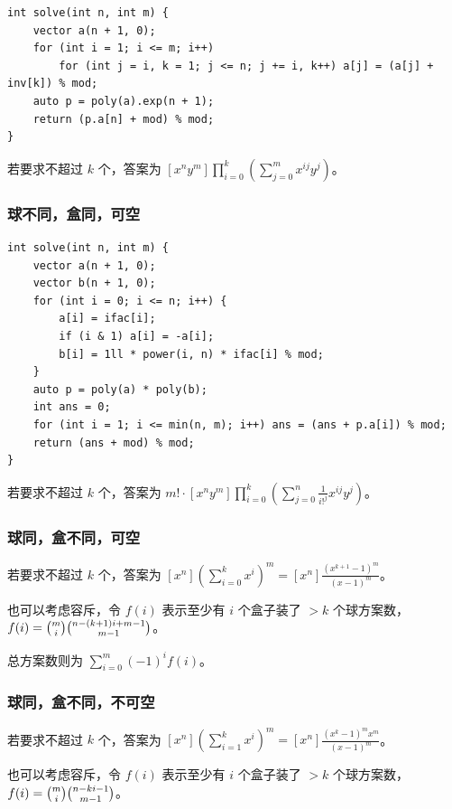 \documentclass[UTF8, twoside]{ctexart}
\begin{document}
\begin{sloppypar}
\begin{lstlisting}[style=cpp]
int solve(int n, int m) {
    vector a(n + 1, 0);
    for (int i = 1; i <= m; i++)
        for (int j = i, k = 1; j <= n; j += i, k++) a[j] = (a[j] + inv[k]) % mod;
    auto p = poly(a).exp(n + 1);
    return (p.a[n] + mod) % mod;
}
\end{lstlisting}

若要求不超过  $k$ 个，答案为 $[x^ny^m]\prod\limits_{i=0}^k \left(\sum\limits_{j=0}^m x^{ij}y^j\right)$。

\subsubsection{球不同，盒同，可空}

\begin{lstlisting}[style=cpp]
int solve(int n, int m) {
    vector a(n + 1, 0);
    vector b(n + 1, 0);
    for (int i = 0; i <= n; i++) {
        a[i] = ifac[i];
        if (i & 1) a[i] = -a[i];
        b[i] = 1ll * power(i, n) * ifac[i] % mod;
    }
    auto p = poly(a) * poly(b);
    int ans = 0;
    for (int i = 1; i <= min(n, m); i++) ans = (ans + p.a[i]) % mod;
    return (ans + mod) % mod;
}
\end{lstlisting}

若要求不超过  $k$ 个，答案为 $m! \cdot [x^ny^m]\prod\limits_{i=0}^k \left(\sum\limits_{j=0}^n\frac{1}{i!^j} x^{ij}y^j\right)$。

\subsubsection{球同，盒不同，可空}

若要求不超过  $k$ 个，答案为 $[x^n]\left(\sum\limits_{i=0}^kx^i\right)^m = [x^n]\frac{(x^{k+1}-1)^m}{(x-1)^m}$。

也可以考虑容斥，令 $f(i)$ 表示至少有 $i$ 个盒子装了 $>k$ 个球方案数，$f(i) = \tbinom{m}{i}\tbinom{n-(k+1)i+m-1}{m-1}$。

总方案数则为 $\sum\limits_{i=0}^{m}(-1)^if(i)$。

\subsubsection{球同，盒不同，不可空}

若要求不超过  $k$ 个，答案为 $[x^n]\left(\sum\limits_{i=1}^kx^i\right)^m = [x^n]\frac{(x^k-1)^mx^m}{(x-1)^m}$。

也可以考虑容斥，令 $f(i)$ 表示至少有 $i$ 个盒子装了 $>k$ 个球方案数，$f(i) = \tbinom{m}{i}\tbinom{n-ki-1}{m-1}$。


\end{sloppypar}
\end{document}
